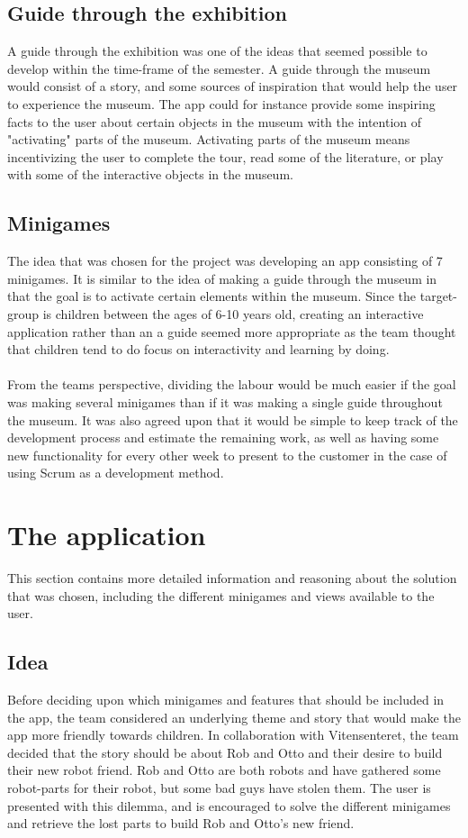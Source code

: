 \subsection{Guide through the exhibition}
A guide through the exhibition was one of the ideas that seemed possible to develop within the time-frame of the semester. A guide through the museum would consist of a story, and some sources of inspiration that would help the user to experience the museum. The app could for instance provide some inspiring facts to the user about certain objects in the museum with the intention of "activating" parts of the museum. Activating parts of the museum means incentivizing the user to complete the tour, read some of the literature, or play with some of the interactive objects in the museum. 

\subsection{Minigames}
The idea that was chosen for the project was developing an app consisting of 7 minigames. It is similar to the idea of making a guide through the museum in that the goal is to activate certain elements within the museum. Since the target-group is children between the ages of 6-10 years old, creating an interactive application rather than an a guide seemed more appropriate as the team thought that children tend to do focus on interactivity and learning by doing. \\
\\
From the teams perspective, dividing the labour would be much easier if the goal was making several minigames than if it was making a single guide throughout the museum. It was also agreed upon that it would be simple to keep track of the development process and estimate the remaining work, as well as having some new functionality for every other week to present to the customer in the case of using Scrum as a development method. 

\section{The application}
This section contains more detailed information and reasoning about the solution that was chosen, including the different minigames and views available to the user.

\subsection{Idea}
Before deciding upon which minigames and features that should be included in the app, the team considered an underlying theme and story that would make the app more friendly towards children. In collaboration with Vitensenteret, the team decided that the story should be about  Rob and Otto and their desire to build their new robot friend. Rob and Otto are both robots and have gathered some robot-parts for their robot, but some bad guys have stolen them. The user is presented with this dilemma, and is encouraged to solve the different minigames and retrieve the lost parts to build Rob and Otto's new friend.

